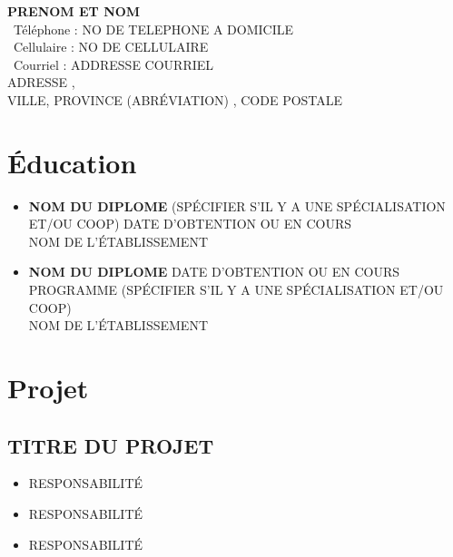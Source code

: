 \documentclass[twoside,letterpaper,11  pt]{article}
\begin{document}
\begin{center} %
{\large \textbf{PRENOM ET NOM }}\\
\Telefon \, Téléphone : NO DE TELEPHONE A DOMICILE \\
\Mobilefone \, Cellulaire : NO DE CELLULAIRE \\
\Letter \, Courriel : ADDRESSE COURRIEL \\
ADRESSE , \\
VILLE, PROVINCE (ABRÉVIATION) , CODE POSTALE \\
\end{center}

\bigbreak

\begin{flushleft}

\bigbreak

\section*{Éducation} %

\begin{itemize}[label={}]

\item \textbf{NOM DU DIPLOME} (SPÉCIFIER S'IL Y A UNE SPÉCIALISATION ET/OU COOP) \hfill DATE D'OBTENTION OU EN COURS\\
NOM DE L'ÉTABLISSEMENT  \\

\vspace{0.2cm}

\item \textbf{NOM DU DIPLOME} \hfill  DATE D'OBTENTION OU EN COURS \\
PROGRAMME (SPÉCIFIER S'IL Y A UNE SPÉCIALISATION ET/OU COOP) \\
NOM DE L'ÉTABLISSEMENT \\
\end{itemize}

\section*{Projet} %

\subsection*{TITRE DU PROJET}
\begin{itemize}[label=\textbullet, font=  \scriptsize]
    \item RESPONSABILITÉ
    \item RESPONSABILITÉ
    \item RESPONSABILITÉ
\end{itemize}


\end{flushleft}
\end{document}
